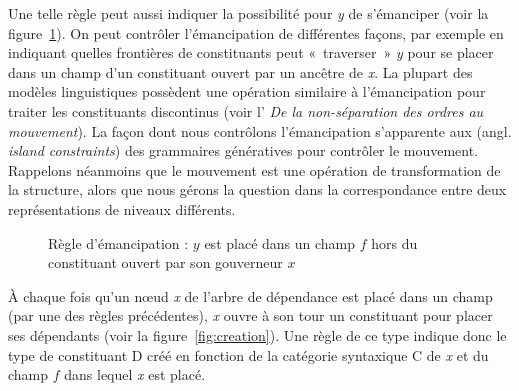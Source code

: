     Une telle règle peut aussi indiquer la possibilité pour \textit{y} de s’émanciper (voir la figure~\ref{fig:regle-emancipation}). On peut contrôler l’émancipation de différentes façons, par exemple en indiquant quelles frontières de constituants peut «~traverser~» \textit{y} pour se placer dans un champ d’un constituant ouvert par un ancêtre de \textit{x}. La plupart des modèles linguistiques possèdent une opération similaire à l’émancipation pour traiter les constituants discontinus (voir l'  \textit{De la non-séparation des ordres au mouvement}). La façon dont nous contrôlons l’émancipation s’apparente aux  (angl. \textit{island constraints}) des grammaires génératives pour contrôler le mouvement. Rappelons néanmoins que le mouvement est une opération de transformation de la structure, alors que nous gérons la question dans la correspondance entre deux représentations de niveaux différents.
  
    
    \begin{figure}[H]
    \caption{Règle d'émancipation : $y$ est placé dans un champ $f$ hors du constituant ouvert par son gouverneur $x$}
    \label{fig:regle-emancipation}
    \end{figure}

   À chaque fois qu’un nœud \textit{x} de l’arbre de dépendance est placé dans un champ (par une des règles précédentes), \textit{x} ouvre à son tour un constituant pour placer ses dépendants (voir la figure~\ref{fig:creation}). Une règle de ce type indique donc le type de constituant D créé en fonction de la catégorie syntaxique C de \textit{x} et du champ $f$ dans lequel \textit{x} est placé.
   
